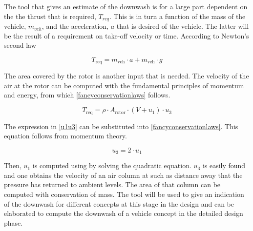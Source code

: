 The tool that gives an estimate of the downwash is for a large part dependent on the the thrust that is required, $T_{req}$. This is in turn a function of the mass of the vehicle, $m_{veh}$, and the acceleration, $a$ that is desired of the vehicle. The latter will be the result of a requirement on take-off velocity or time. According to Newton's second law 

\begin{equation}
\label{downwasheq}
    T_\text{req} = m_\text{veh} \cdot a + m_\text{veh} \cdot g 
\end{equation}

The area covered by the rotor is another input that is needed. The velocity of the air at the rotor can be computed with the fundamental principles of momentum and energy, from which \autoref{fancyconservationlaws} follows.

\begin{equation}
\label{fancyconservationlaws}
    T_\text{req} = \rho\cdot A_\text{rotor}\cdot(V + u_1)\cdot u_3 
\end{equation}



The expression in \autoref{u1u3} can be substituted into \autoref{fancyconservationlaws}. This equation follows from momentum theory. 

\begin{equation}
\label{u1u3}
    u_3 = 2\cdot u_1
\end{equation}

Then, $u_1$ is computed using by solving the quadratic equation. $u_3$ is easily found and one obtains the velocity of an air column at such as distance away that the pressure has returned to ambient levels. The area of that column can be computed with conservation of mass. The tool will be used to give an indication of the downwash for different concepts at this stage in the design and can be elaborated to compute the downwash of a vehicle concept in the detailed design phase. 

